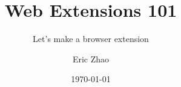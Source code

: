 \documentclass[xcolor={dvipsnames},xtable]{beamer}
\title{Web Extensions 101}
\subtitle{Let's make a browser extension}
\date{\today}
\author{Eric Zhao}
\begin{document}

\newcommand{\sectiontitle}{}
\newcommand{\currenttitle}{}

\maketitle

\newcommand{\subdir}{sections}
\newcommand{\emojisubdir}{emojisub}
\newcommand{\templatedir}{template}







\end{document}
